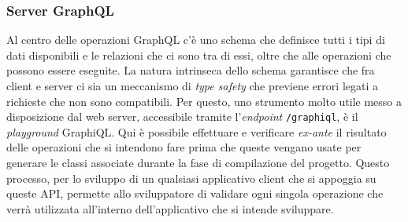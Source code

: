 \subsubsection{Server GraphQL}

Al centro delle operazioni GraphQL c'è uno schema che definisce tutti i tipi di dati disponibili e le relazioni che ci sono tra di essi, oltre che alle operazioni che possono essere eseguite. La natura intrinseca dello schema garantisce che fra client e server ci sia un meccanismo di \textit{type safety} che previene errori legati a richieste che non sono compatibili. Per questo, uno strumento molto utile messo a disposizione dal web server, accessibile tramite l'\textit{endpoint} \texttt{/graphiql}, è il \textit{playground} GraphiQL. Qui è possibile effettuare e verificare \textit{ex-ante} il risultato delle operazioni che si intendono fare prima che queste vengano usate per generare le classi associate durante la fase di compilazione del progetto. Questo processo, per lo sviluppo di un qualsiasi applicativo client che si appoggia su queste \ac{API}, permette allo sviluppatore di validare ogni singola operazione che verrà utilizzata all'interno dell'applicativo che si intende sviluppare.


